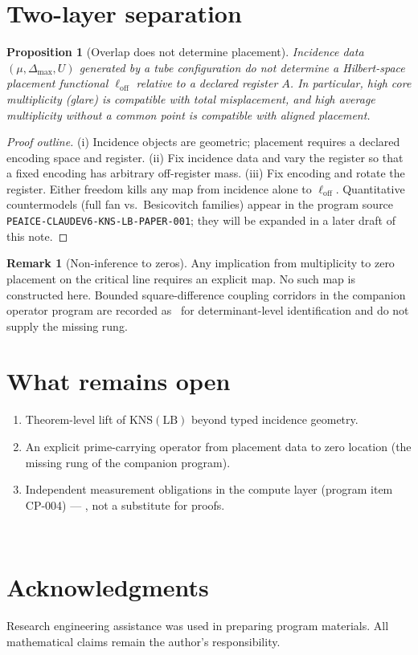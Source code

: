 \documentclass[11pt]{amsart}
\theoremstyle{plain}
\newtheorem{proposition}[theorem]{Proposition}
\theoremstyle{definition}
\newtheorem{remark}[theorem]{Remark}
\begin{document}
\section{Two-layer separation}

\begin{proposition}[Overlap does not determine placement]
\label{prop:sep}
Incidence data $(\mu,\Delta_{\max},U)$ generated by a tube configuration do not
determine a Hilbert-space placement functional $\ell_{\mathrm{off}}$ relative
to a declared register $A$. In particular, high core multiplicity (glare) is
compatible with total misplacement, and high average multiplicity without a
common point is compatible with aligned placement.
\end{proposition}

\begin{proof}[Proof outline]
(i) Incidence objects are geometric; placement requires a declared encoding
space and register. (ii) Fix incidence data and vary the register so that a
fixed encoding has arbitrary off-register mass. (iii) Fix encoding and rotate
the register. Either freedom kills any map from incidence alone to
$\ell_{\mathrm{off}}$. Quantitative countermodels (full fan vs.\ Besicovitch
families) appear in the program source
\texttt{PEAICE-CLAUDEV6-KNS-LB-PAPER-001}; they will be expanded in a later
draft of this note.
\end{proof}

\begin{remark}[Non-inference to zeros]
Any implication from multiplicity to zero placement on the critical line
requires an explicit map. No such map is constructed here. Bounded
square-difference coupling corridors in the companion operator program are
recorded as \PeAIceClosedNeg\ for determinant-level identification and do not
supply the missing rung.
\end{remark}

\section{What remains open}

\begin{enumerate}[leftmargin=*]
  \item Theorem-level lift of $\mathrm{KNS}(\mathrm{LB})$ beyond typed
  incidence geometry.
  \item An explicit prime-carrying operator from placement data to zero
  location (the missing rung of the companion program).
  \item Independent measurement obligations in the compute layer (program
  item CP-004) --- \PeAIceOpen, not a substitute for proofs.
\end{enumerate}

\PeAIceOpenTargets\
\KNSFirewall

\section*{Acknowledgments}
Research engineering assistance was used in preparing program materials.
All mathematical claims remain the author's responsibility.



\end{document}
